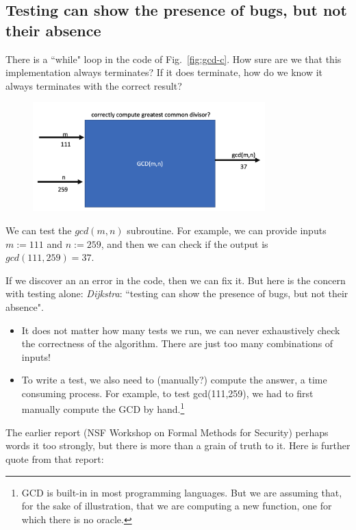 \documentclass[runningheads,12pt]{article}
\begin{document}

\subsection{Testing can show the presence of bugs, but not their absence}

There is a ``while" loop in the code of Fig.~\ref{fig:gcd-c}. How sure are we that this implementation always terminates? If it does terminate, how do we know it always terminates with the correct result?

\begin{figure}[hbt]
  \includegraphics[width=0.8\textwidth]{images/gcd.png}
\end{figure}


We can test the $gcd(m,n)$ subroutine. For example, we can provide inputs $m := 111$ and $n := 259$, and then we can check if the output is $gcd(111,259) = 37$. 

If we discover an an error in the code, then we can fix it. But here is the concern with testing alone: \textit{Dijkstra}: ``testing can show the presence of bugs, but not their absence". 

\begin{itemize}
  \item It does not matter how many tests we run, we can never exhaustively check the correctness of the algorithm. There are just too many combinations of inputs!
  \item To write a test, we also need to (manually?) compute the answer, a time consuming process. For example, to test gcd(111,259), we had to first manually compute the GCD by hand.\footnote{GCD is built-in in most programming languages. But we are assuming that, for the sake of illustration, that we are computing a new function, one for which there is no oracle.}
\end{itemize}

The earlier report (NSF Workshop on Formal Methods for Security) perhaps words it too strongly, but there is more than a grain of truth to it. Here is further quote from that report:
\end{document}

